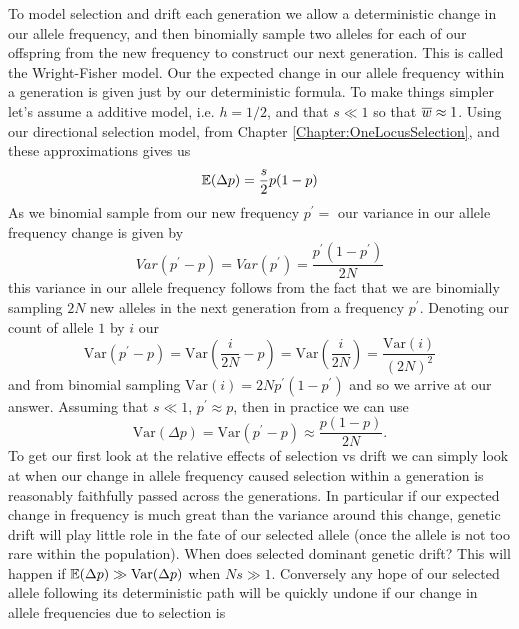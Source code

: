  To model selection and drift each generation we allow a deterministic change in our
allele frequency, and then binomially sample two alleles for each of
our offspring from the new frequency to construct our next
generation. This is called the Wright-Fisher model. Our the expected change in our allele frequency within a generation is given just by our
deterministic formula. To make things simpler let's assume a
additive model, i.e. $h=1/2$, and that $s \ll 1$ so that $\overline{w}
\approx 1$. Using our directional selection model, from Chapter
\ref{Chapter:OneLocusSelection}, and these approximations gives us
\begin{equation}
\mathbb{E}(\Delta p ) = \frac{s}{2} p(1-p) \label{eqn:WF_mean}
\end{equation}
As we binomial sample from our new frequency $p^{\prime}=$
our variance in our allele frequency change is given by
\begin{equation}
Var(p^{\prime} - p) = Var(p^{\prime}) = \frac{p^{\prime}(1-p^{\prime})}{2N}
\end{equation}
this variance in our allele frequency follows from the fact that we
are binomially sampling $2N$ new alleles in the next
generation from a frequency $p^{\prime}$. Denoting our count of allele $1$ by $i$ our
\begin{equation}
\textrm{Var} (p^{\prime} - p) = \textrm{Var} (\frac{i}{2N} - p) =  \textrm{Var} (\frac{i}{2N} ) =\frac{\textrm{Var} (i)}{(2N)^2}
\end{equation}
and from binomial sampling $\textrm{Var} (i) = 2N p^{\prime}(1-p^{\prime})$ and
so we arrive at our answer. Assuming that $s \ll 1$, $p^{\prime}
\approx p$, then in practice we can use
\begin{equation}
\textrm{Var} (\Delta p)  =\textrm{Var} (p^{\prime} - p) \approx \frac{p(1-p)}{2N}. \label{eqn:WF_var}
\end{equation}
To get our first look at the relative effects of selection vs drift we
can simply look at when our change in allele frequency caused
selection within a generation is reasonably faithfully passed across
the generations. In particular if our expected change in frequency is much
great than the variance around this change, genetic drift will play
little role in the fate of our selected allele (once the allele is not
too rare within the population). When does selected
dominant genetic drift? This will happen if $\mathbb{E}(\Delta p) \gg \textrm{Var}(\Delta p)$ when $Ns \gg 1$. Conversely any
hope of our selected allele following its deterministic path will be quickly undone if our change in allele frequencies due to selection is
